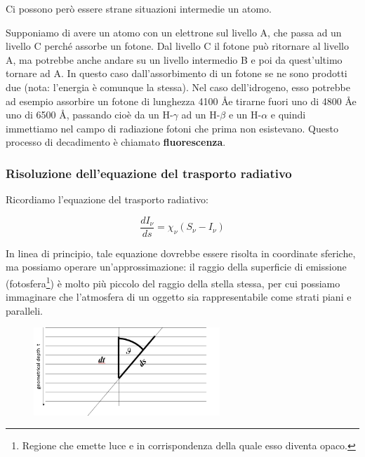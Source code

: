 \vspace{0.2cm}Ci possono però essere strane situazioni intermedie un atomo.

Supponiamo di avere un atomo con un elettrone sul livello A, che passa ad un livello C perché assorbe un fotone. Dal livello C il fotone può ritornare al livello A, ma potrebbe anche andare su un livello intermedio B e poi da quest'ultimo tornare ad A. In questo caso dall'assorbimento di un fotone se ne sono prodotti due (nota: l'energia è comunque la stessa). Nel caso dell'idrogeno, esso potrebbe ad esempio assorbire un fotone di lunghezza 4100 \AA e tirarne fuori uno di 4800 \AA e uno di 6500 \AA, passando cioè da un H-$\gamma$ ad un H-$\beta$ e un H-$\alpha$ e quindi immettiamo nel campo di radiazione fotoni che prima non esistevano. Questo processo di decadimento è chiamato \textbf{fluorescenza}.


\subsubsection{Risoluzione dell'equazione del trasporto radiativo}

Ricordiamo l'equazione del trasporto radiativo:

$$\frac{dI_{\nu}}{ds}=\chi_{\nu}(S_{\nu}-I_{\nu})$$

In linea di principio, tale equazione dovrebbe essere risolta in coordinate sferiche, ma possiamo operare un'approssimazione: il raggio della superficie di emissione (fotosfera\footnote{Regione che emette luce e in corrispondenza della quale esso diventa opaco.}) è molto più piccolo del raggio della stella stessa, per cui possiamo immaginare che l'atmosfera di un oggetto sia rappresentabile come strati piani e paralleli.


\begin{figure}[H]
    \centering
    \includegraphics[width=7cm]{28-10-15(geometria_risoluzione_equazione_trasporto_radiativo).png}
    \label{fig:geometria_eq_trasporto_radiativo}
\end{figure}

